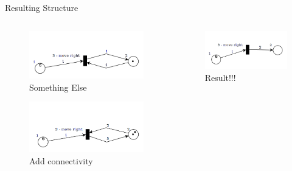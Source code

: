\documentclass[12pt]{beamer}
\begin{document}
\begin{frame}{Resulting Structure}
\begin{columns}[]
  \begin{column}{2in}
  \begin{figure}
\includegraphics[scale=0.3]{PetriNet_1_1}
\caption{Something Else}
\end{figure}

\begin{figure}
\includegraphics[scale=0.3]{PetriNet_1_2}
\caption{Add connectivity}
\end{figure}
  \end{column}
  \begin{column}{2in}
  \begin{figure}
\includegraphics[scale=0.3]{PetriNet_1_3}
\caption{Result!!!}
\end{figure}


\end{column}
\end{columns}
\end{frame}
\end{document}

